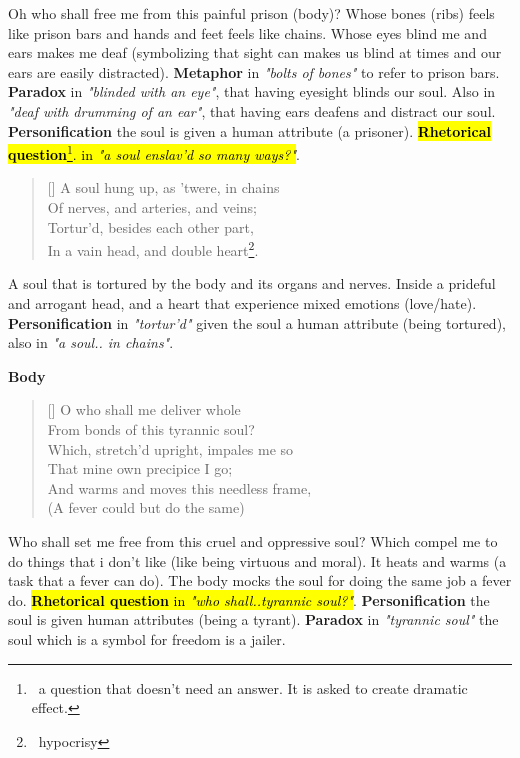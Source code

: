 \documentclass[12pt, a4paper]{article}
\begin{document}
Oh who shall free me from this painful prison (body)?
Whose bones (ribs) feels like prison bars and hands
and feet feels like chains. Whose eyes blind me 
and ears makes me deaf (symbolizing that sight can 
makes us blind at times and our ears are easily distracted). 
\textbf{Metaphor} in \textit{"bolts of bones"} to refer to prison bars. 
\textbf{Paradox} in \textit{"blinded with an eye"}, that
having eyesight blinds our soul. Also in \textit{"deaf with
drumming of an ear"}, that having ears deafens and distract our
soul. \textbf{Personification} the soul is given a human attribute
(a prisoner). \hl{\textbf{Rhetorical question}\footnote{\, 
a question that doesn't need an answer. It is asked to create dramatic effect.}.
in \textit{"a soul enslav’d so many ways?"}}. 

\begin{verse}[\versewidth]
{\fontverse
A soul hung up, as ’twere, in chains\\
Of nerves, and arteries, and veins;\\
Tortur’d, besides each other part,\\
In a vain head, and double heart\footnote{\, hypocrisy}. 
} 
\end{verse}

A soul that is tortured by the body and its organs and nerves.
Inside a prideful and arrogant head, and a heart that experience
mixed emotions (love/hate). \textbf{Personification} in \textit{"tortur'd"} 
given the soul a human attribute (being tortured), also in \textit{"a soul.. in chains"}.\bigbreak

\newpage
\centerline{\textbf{\large{Body}}}
\begin{verse}[\versewidth]
{\fontverse
O who shall me deliver whole\\
From bonds of this tyrannic soul?\\
Which, stretch’d upright, impales me so\\
That mine own precipice I go;\\
And warms and moves this needless frame,\\
(A fever could but do the same)
} 
\end{verse}

Who shall set me free from this cruel and oppressive soul? Which compel 
me to do things that i don't like (like being virtuous and moral). It 
heats and warms (a task that a fever can do). The body mocks the soul 
for doing the same job a fever do. \hl{\textbf{Rhetorical question} in
\textit{"who shall..tyrannic soul?"}}. \textbf{Personification} the soul
is given human attributes (being a tyrant). \textbf{Paradox} in \textit{"tyrannic soul"}
the soul which is a symbol for freedom is a jailer.
\end{document}
